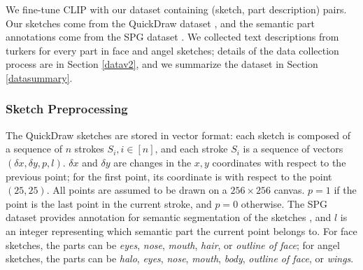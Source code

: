 

We fine-tune CLIP with our dataset containing (sketch, part description) pairs. Our sketches come from the QuickDraw dataset \citep{ha2017neural}, and the semantic part annotations come from the SPG dataset \citep{spg_paper}. We collected text descriptions from turkers for every part in face and angel sketches; details of the data collection process are in Section \ref{datav2}, and we summarize the dataset in Section \ref{datasummary}.  

\subsubsection*{Sketch Preprocessing} \label{sketch.preprocess}
The QuickDraw sketches are stored in vector format: each sketch is composed of a sequence of $n$ strokes $S_i, i \in [n]$, and each stroke $S_i$ is a sequence of vectors $(\delta x,\delta y, p, l)$. 
$\delta x$ and $\delta y$ are changes in the $x,y$ coordinates with respect to the previous point; for the first point, its coordinate is with respect to the point $(25,25)$. 
All points are assumed to be drawn on a $256 \times 256$ canvas. 
$p=1$ if the point is the last point in the current stroke, and $p=0$ otherwise. 
The SPG dataset provides annotation for semantic segmentation of the sketches \citep{spg_paper}, and $l$ is an integer representing which semantic part the current point belongs to. For face sketches, the parts can be \textit{eyes}, \textit{nose}, \textit{mouth}, \textit{hair}, or \textit{outline of face}; for angel sketches, the parts can be \textit{halo}, \textit{eyes}, \textit{nose}, \textit{mouth}, \textit{body}, \textit{outline of face}, or \textit{wings}.

